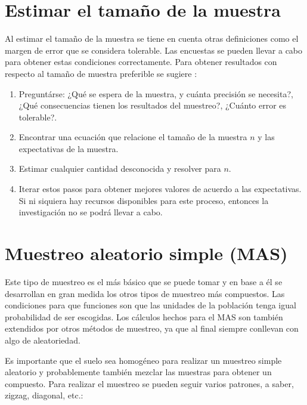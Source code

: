 \documentclass{report}
\begin{document}
\bigbreak

\section{Estimar el tamaño de la muestra}

Al estimar el tamaño de la muestra se tiene en cuenta otras definiciones como el margen de error que se considera tolerable. Las encuestas se pueden llevar a cabo para obtener estas condiciones correctamente. Para obtener resultados con respecto al tamaño de muestra preferible se sugiere \cite{lohr-2009}:

\begin{enumerate}
    \item Preguntárse: ¿Qué se espera de la muestra, y cuánta precisión se necesita?, ¿Qué consecuencias tienen los resultados del muestreo?, ¿Cuánto error es tolerable?.
    
    \item Encontrar una ecuación que relacione el tamaño de la muestra $n$ y las expectativas de la muestra.
    
    \item Estimar cualquier cantidad desconocida y resolver para $n$.
    
    \item Iterar estos pasos para obtener mejores valores de acuerdo a las expectativas. Si ni siquiera hay recursos disponibles para este proceso, entonces la investigación no se podrá llevar a cabo.
\end{enumerate}

\section{Muestreo aleatorio simple (MAS)}

Este tipo de muestreo es el más básico que se puede tomar y en base a él se desarrollan en gran medida los otros tipos de muestreo más compuestos. Las condiciones para que funciones son que las unidades de la población tenga igual probabilidad de ser escogidas. Los cálculos hechos para el MAS son también extendidos por otros métodos de muestreo, ya que al final siempre conllevan con algo de aleatoriedad. 

\bigbreak

Es importante que el suelo sea homogéneo para realizar un muestreo simple aleatorio y probablemente también mezclar las muestras para obtener un compuesto. Para realizar el muestreo se pueden seguir varios patrones, a saber, zigzag, diagonal, etc.:
\end{document}
